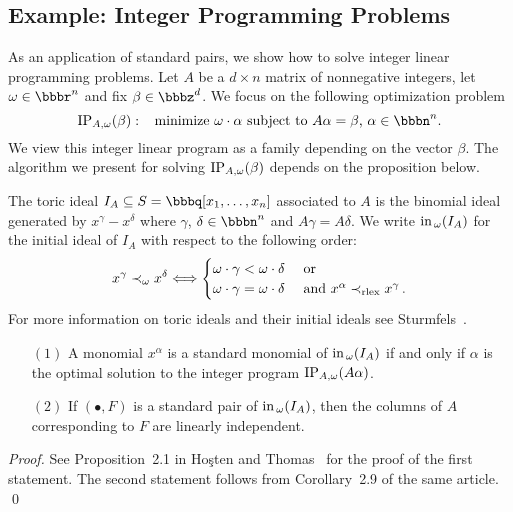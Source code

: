 \subsection*{Example: Integer Programming Problems}

As an application of standard pairs, we show how
to solve integer linear programming problems.
Let $A$ be a $d \times n$ matrix of nonnegative integers, let $\omega
\in \bbbr^{n}$ and fix $\beta \in \bbbz^{d}$.  We focus on the
following optimization problem
\[
\IP_{A,\omega}(\beta) : \,\,\, \text{ minimize $\omega \cdot \alpha$
subject to $A \alpha = \beta$, $\alpha \in \bbbn^n$.}
\] 
We view this integer linear program as a family depending on the
vector $\beta$.  The algorithm we present for solving
$\operatorname{IP}_{A,\omega}(\beta)$ depends on the proposition below.

The toric ideal $I_{A} \subseteq
S = \bbbq[x_{1}, \dotsc, x_{n}]$ associated to $A$ is the binomial
ideal generated by $x^{\gamma} - x^{\delta}$ where $\gamma$, $\delta
\in \bbbn^{n}$ and $A \gamma = A \delta$.  We write $\operatorname{in}_{\,
\omega}(I_{A})$ for the initial ideal of $I_A$
with respect to the following order:
\[
x^{\gamma} \prec_{\omega} x^{\delta} \Longleftrightarrow \begin{cases}
\omega \cdot \gamma < \omega \cdot \delta & \text{ or } \\ 
\omega \cdot \gamma = \omega \cdot \delta & \text{ and } x^{\alpha}
\prec_{{\rm rlex}} x^{\gamma} \, .
\end{cases}
\]
For more information on toric ideals and their initial ideals see
Sturmfels~\cite{MR97b:13034}.

\begin{proposition} 
\begin{enumerate}
\item[$(1)$] A monomial $x^{\alpha}$ is a standard monomial of
$\operatorname{in}_{\, \omega}(I_{A})$ if and only if $\alpha$ is the optimal
solution to the integer program $\operatorname{IP}_{A,\omega}(A\alpha)$.
\item[$(2)$] If $(\bullet, F)$ is a standard pair of
$\operatorname{in}_{\, \omega}(I_{A})$, then the columns of $A$ corresponding to
$F$ are linearly independent.
\end{enumerate}
\end{proposition} 

\begin{proof} 
See Proposition~2.1 in Ho\c{s}ten and Thomas~\cite{MR2000b:13037} for
the proof of the first statement. The second statement follows from
Corollary~2.9 of the same article.
\qed
\end{proof}

